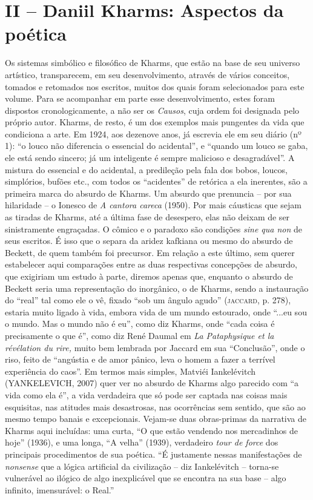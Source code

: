 \section{II -- Daniil Kharms: Aspectos da poética}

Os sistemas simbólico e filosófico de Kharms, que estão na base de seu
universo artístico, transparecem, em seu desenvolvimento, através de
vários conceitos, tomados e retomados nos escritos, muitos dos quais
foram selecionados para este volume. Para se acompanhar em parte esse
desenvolvimento, estes foram dispostos cronologicamente, a não ser os
\emph{Causos}, cuja ordem foi designada pelo próprio autor. Kharms, de
resto, é um dos exemplos mais pungentes da vida que condiciona a arte.
Em 1924, aos dezenove anos, já escrevia ele em seu diário (nº 1): ``o
louco não diferencia o essencial do acidental'', e ``quando um louco se
gaba, ele está sendo sincero; já um inteligente é sempre malicioso e
desagradável''. A mistura do essencial e do acidental, a predileção pela
fala dos bobos, loucos, simplórios, bufões etc., com todos os
``acidentes'' de retórica a ela inerentes, são a primeira marca do
absurdo de Kharms. Um absurdo que prenuncia -- por sua hilaridade -- o
Ionesco de \emph{A cantora careca} (1950). Por mais cáusticas que sejam
as tiradas de Kharms, até a última fase de desespero, elas não deixam de
ser sinistramente engraçadas. O cômico e o paradoxo são condições
\emph{sine qua non} de seus escritos. É isso que o separa da aridez
kafkiana ou mesmo do absurdo de Beckett, de quem também foi precursor.
Em relação a este último, sem querer estabelecer aqui comparações entre
as duas respectivas concepções de absurdo, que exigiriam um estudo à
parte, diremos apenas que, enquanto o absurdo de Beckett seria uma
representação do inorgânico, o de Kharms, sendo a instauração do
``real'' tal como ele o vê, fixado ``sob um ângulo agudo''
(\textsc{jaccard}, p. 278), estaria muito ligado à vida, embora vida de
um mundo estourado, onde ``...eu sou o mundo. Mas o mundo não é eu'',
como diz Kharms, onde ``cada coisa é precisamente o que é'', como diz
René Daumal em \emph{La Pataphysique et la révélation du rire,} muito
bem lembrada por Jaccard em sua ``Conclusão'', onde o riso, feito de
``angústia e de amor pânico, leva o homem a fazer a terrível experiência
do caos''. Em termos mais simples, Matviéi Iankelévitch (YANKELEVICH,
2007) quer ver no absurdo de Kharms algo parecido com ``a vida como ela
é'', a vida verdadeira que só pode ser captada nas coisas mais
esquisitas, nas atitudes mais desastrosas, nas ocorrências sem sentido,
que são ao mesmo tempo banais e excepcionais. Vejam-se duas obras-primas
da narrativa de Kharms aqui incluídas: uma curta, ``O que estão vendendo
nos mercadinhos de hoje'' (1936), e uma longa, ``A velha'' (1939),
verdadeiro \emph{tour de force} dos principais procedimentos de sua
poética. ``É justamente nessas manifestações de \emph{nonsense} que a
lógica artificial da civilização -- diz Iankelévitch -- torna-se
vulnerável ao ilógico de algo inexplicável que se encontra na sua base
-- algo infinito, imensurável: o Real.''

